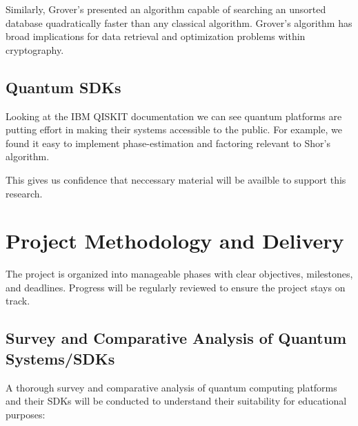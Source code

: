 \documentclass[11pt,a4paper]{article}
\begin{document}
Similarly, Grover’s  \cite{Grover:1996} presented an algorithm capable of searching an unsorted database quadratically 
faster than any classical algorithm.
Grover's algorithm has broad implications for data retrieval and optimization problems within cryptography.

\subsection{Quantum SDKs}

Looking at the IBM QISKIT documentation \cite{Qiskit:2023} we can see quantum platforms are putting effort in making their systems accessible to the 
public.  For example, we found it easy to implement phase-estimation and factoring \cite{Qiskit:2024a} relevant to Shor's algorithm.

This gives us confidence that neccessary material will be availble to support this research.


\section{Project Methodology and Delivery}

The project is organized into manageable phases with clear objectives, milestones, and deadlines.
Progress will be regularly reviewed to ensure the project stays on track.

\subsection{Survey and Comparative Analysis of Quantum Systems/SDKs}

A thorough survey and comparative analysis of quantum computing platforms and their SDKs will be conducted to understand their suitability for educational purposes:
\end{document}
